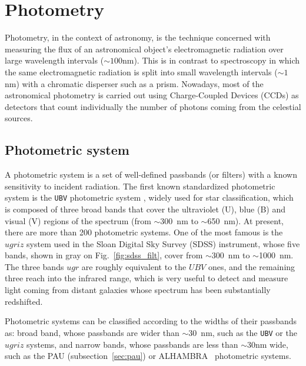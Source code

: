 \section{Photometry}
\label{sec:photometry}
Photometry, in the context of astronomy, is the technique concerned with measuring the flux of an astronomical object's electromagnetic radiation over large wavelength intervals ($\sim100$nm). This is in contrast to spectroscopy in which the same electromagnetic radiation is split into small wavelength intervals ($\sim1$nm) with a chromatic disperser such as a prism. Nowadays, most of the astronomical photometry is carried out using Charge-Coupled Devices (CCDs) as detectors that count individually the number of photons coming from the celestial sources.

\subsection{Photometric system}
A photometric system is a set of well-defined passbands (or filters) with a known sensitivity to incident radiation. The first known standardized photometric system is the \texttt{UBV} photometric system \citep{Johnson1953}, widely used for star classification, which is composed of three broad bands that cover the ultraviolet (U), blue (B) and visual (V) regions of the spectrum (from $\sim$300~nm to $\sim$650~nm). At present, there are more than 200 photometric systems. One of the most famous is the $ugriz$ system \citep{Fukugita1996} used in the Sloan Digital Sky Survey (SDSS) instrument, whose five bands, shown in gray on Fig.~\ref{fig:sdss_filt}, cover from $\sim$300~nm to $\sim$1000~nm. The three bands $ugr$ are roughly equivalent to the $UBV$ ones, and the remaining three reach into the infrared range, which is very useful to detect and measure light coming from distant galaxies whose spectrum has been substantially redshifted.

Photometric systems can be classified according to the widths of their passbands as: broad band, whose passbands are wider than $\sim30$~nm, such as the \texttt{UBV} or the $ugriz$ systems, and narrow bands, whose passbands are less than $\sim30$nm wide, such as the PAU (subsection~\ref{sec:pau}) or ALHAMBRA~\citep{Moles2008} photometric systems.

